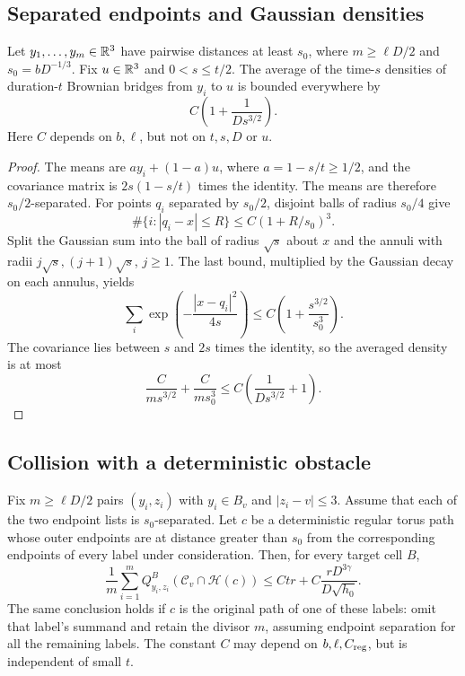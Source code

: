 \subsection{Separated endpoints and Gaussian densities}

\begin{lemma}\label{bridge:gaussian-packing}
Let $y_1,\ldots,y_m\in\mathbb R^3$ have pairwise distances at least $s_0$, where
$m\ge\ell D/2$ and $s_0=bD^{-1/3}$.  Fix $u\in\mathbb R^3$ and
$0<s\le t/2$.  The average of the time-$s$ densities of duration-$t$
Brownian bridges from $y_i$ to $u$ is bounded everywhere by
\begin{equation}\label{bridge:packed-density}
 C\left(1+\frac{1}{D s^{3/2}}\right).
\end{equation}
Here $C$ depends on $b,\ell$, but not on $t,s,D$ or $u$.
\end{lemma}

\begin{proof}
The means are $a y_i+(1-a)u$, where $a=1-s/t\ge1/2$, and the covariance
matrix is $2s(1-s/t)$ times the identity.  The means are therefore
$s_0/2$-separated.  For points $q_i$ separated by $s_0/2$, disjoint balls
of radius $s_0/4$ give
\[
 \#\{i:|q_i-x|\le R\}\le C(1+R/s_0)^3.
\]
Split the Gaussian sum into the ball of radius $\sqrt{s}$ about $x$ and
the annuli with radii $j\sqrt{s},(j+1)\sqrt{s}$, $j\ge1$.  The last
bound, multiplied by the Gaussian decay on each annulus, yields
\[
 \sum_i \exp\!\left(-\frac{|x-q_i|^2}{4s}\right)
 \le C\left(1+\frac{s^{3/2}}{s_0^3}\right).
\]
The covariance lies between $s$ and $2s$ times the identity, so the
averaged density is at most
\[
 \frac{C}{m s^{3/2}}+\frac{C}{m s_0^3}
 \le C\left(\frac{1}{D s^{3/2}}+1\right).
\]
\end{proof}

\subsection{Collision with a deterministic obstacle}

\begin{proposition}\label{bridge:averaged-hit}
Fix $m\ge\ell D/2$ pairs $(y_i,z_i)$ with $y_i\in B_v$ and
$|z_i-v|\le3$.  Assume that each of the two endpoint lists is
$s_0$-separated.  Let $c$ be a deterministic regular torus path whose
outer endpoints are at distance greater than $s_0$ from the corresponding
endpoints of every label under consideration.  Then, for every target
cell $B$,
\begin{equation}\label{bridge:averaged-estimate}
 \frac1m\sum_{i=1}^m
 Q_{y_i,z_i}^{B}(\mathcal C_v\cap\mathcal H(c))
 \le Ctr+C\frac{rD^{3\gamma}}{D\sqrt{h_0}}.
\end{equation}
The same conclusion holds if $c$ is the original path of one of these
labels: omit that label's summand and retain the divisor $m$, assuming
endpoint separation for all the remaining labels.  The constant $C$ may
depend on $b,\ell,C_{\rm reg}$, but is independent of small $t$.
\end{proposition}

